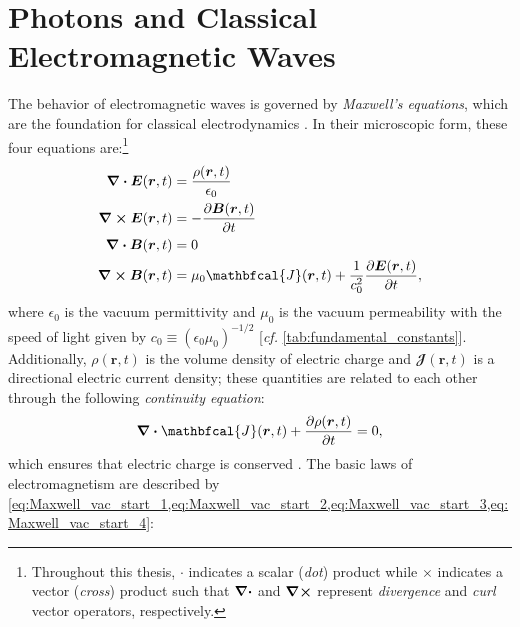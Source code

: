 \section{Photons and Classical Electromagnetic Waves}\label{sec:EM_waves_vac}
The behavior of electromagnetic waves is governed by \emph{Maxwell's equations}, which are the foundation for classical electrodynamics \cite{Landau60,Jackson75,Born80,Rybicki86,Kahn02,Griffiths17,Attwood17}. 
In their microscopic form, these four equations are:\footnote{Throughout this thesis, $\cdot$ indicates a scalar (\emph{dot}) product while $\times$ indicates a vector (\emph{cross}) product such that $\divergence$ and $\curl$ represent \emph{divergence} and \emph{curl} vector operators, respectively.} 
\begin{subequations}
\begin{align}
 \div \mathbold{E}(\mathbold{r},t) &= \frac{\rho(\mathbold{r},t)}{\epsilon_0} \label{eq:Maxwell_vac_start_1} \\
 \curl \mathbold{E}(\mathbold{r},t) &= - \pdv{\mathbold{B}(\mathbold{r},t)}{t} \label{eq:Maxwell_vac_start_2}\\
 \div \mathbold{B}(\mathbold{r},t) &= 0 \label{eq:Maxwell_vac_start_3} \\
 \curl \mathbold{B}(\mathbold{r},t) &= \mu_0 \mathbfcal{J}(\mathbold{r},t) + \frac{1}{c_0^2} \pdv{\mathbold{E}(\mathbold{r},t)}{t}, \label{eq:Maxwell_vac_start_4}
 \end{align}
\end{subequations}
where $\epsilon_0$ is the vacuum permittivity and $\mu_0$ is the vacuum permeability with the speed of light given by $c_0 \equiv \left( \epsilon_0 \mu_0 \right)^{-1/2}$ [\emph{cf.\@} \cref{tab:fundamental_constants}]. 
Additionally, $\rho(\mathbold{r},t)$ is the volume density of electric charge and $\mathbfcal{J}(\mathbold{r},t)$ is a directional electric current density; these quantities are related to each other through the following \emph{continuity equation}:
\begin{equation} \label{eq:continuity}
 \divergence \mathbfcal{J}(\mathbold{r},t) + \pdv{\rho(\mathbold{r},t)}{t} = 0 , 
 \end{equation}
which ensures that electric charge is conserved \cite{Landau60,Jackson75,Born80,Rybicki86,Griffiths17,Attwood17}. 
The basic laws of electromagnetism are described by \cref{eq:Maxwell_vac_start_1,eq:Maxwell_vac_start_2,eq:Maxwell_vac_start_3,eq:Maxwell_vac_start_4}: 
